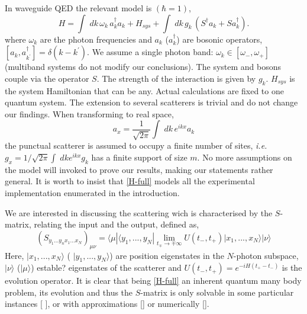 \documentclass[notitlepage, prx, preprint, amsmath,superscriptaddress,amssymb]{revtex4-1}
\begin{document}
In waveguide QED the relevant model is  $(\hbar=1)$, 
\begin{equation}
H = \int \; d k  \, \omega_k \, a_k^\dagger a_k + H_{sys} + \int \; dk  \,  g_k  \, (S^\dagger a_k + S a_k^\dagger).
\label{H-full}
\end{equation}
where $\omega_k$ are the photon frequencies and $a_k$ ($a_k^\dagger$) are bosonic operators, $[a_k, a_{k^\prime}^\dagger]= \delta (k - k^\prime)$.
We assume a single photon band:  $\omega_k \in [\omega_-, \omega_+]$  (multiband systems do not modify our conclusions). 
The system and bosons couple via the operator $S$. The strength of the interaction is given by  $g_k$.   $H_{sys}$ is the system Hamiltonian that can be any.  
Actual calculations are fixed to one quantum system.  The extension to several scatterers  is trivial and do not change our findings.   When transforming to real space,
\begin{equation}
\label{axak}
a_x = \frac{1}{\sqrt{2 \pi } } \int \; d k   \, e^{i k x} a_k  
\end{equation}
the punctual scatterer is assumed to occupy a finite number of sites, \emph{i.e.} $g_x = 1/\sqrt{2 \pi } \int \; dk  e^{i k x} g_k$ has a finite support of size $m$. 
No more assumptions on the model  will  invoked to prove our results, making our statements rather general. It is worth to insist that \eqref{H-full} models all the experimental implementation enumerated in the introduction.


We are interested in discussing the scattering wich is characterised by the $S$-matrix, relating the input and the output, defined as,
\begin{equation}
\label{Sdef}
( S_{y_1 ...y_n x_1...x_N} )_{\mu \nu} = \langle \mu | \langle y_1, ..., y_N | \lim_{t_\mp  \to \mp \infty} U(t_-, t_+) | x_1, ..., x_N \rangle | \nu \rangle
\end{equation}
Here, $|x_1, ...,x_N\rangle$ ( $|y_1, ...,y_N\rangle$)  are  position eigenstates in the $N$-photon subspace,  $|\nu \rangle$  ($|\mu\rangle$) {\color{blue} estable?} eigenstates of the scatterer and $U (t_-, t_+) = e^{-i H (t_+-t_-)}$ is the evolution operator.  
It is clear that being \eqref{H-full} an inherent quantum many body problem, its evolution and thus the $S$-matrix is only solvable in some particular instances [ ], or with  approximations [] or numerically [].    
\end{document}
